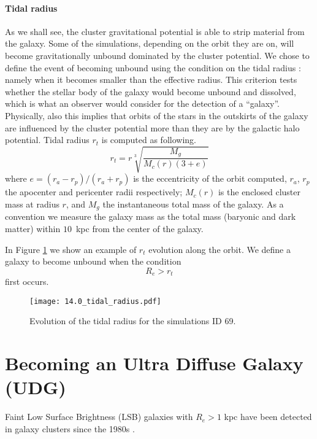 \paragraph*{Tidal radius}
As we shall see, the cluster gravitational potential is able to strip material from the galaxy. Some of the simulations, depending on the orbit they are on, will become gravitationally unbound dominated by the cluster potential.
We chose to define the event of becoming unbound using the condition on the tidal radius \cite{King1962}: namely when it becomes smaller than the effective radius.
This criterion tests whether the stellar body of the galaxy would become unbound and dissolved, which is what an observer would consider for the detection of a ``galaxy''.
Physically, also this implies that orbits of the stars in the outskirts of the galaxy are influenced by the cluster potential more than they are by the galactic halo potential.
Tidal radius $r_t$ is computed as following.
\begin{equation}
r_t = r \sqrt[3]{\frac{M_g}{M_c(r) (3+e)}}
\label{eq:tidal_radius}
\end{equation}
where $e = (r_a - r_p) / (r_a + r_p)$ is the eccentricity of the orbit computed, $r_a$, $r_p$ the apocenter and pericenter radii respectively; $M_c(r)$ is the enclosed cluster mass at radius $r$, and $M_g$ the instantaneous total mass of the galaxy.
As a convention we measure the galaxy mass as the total mass (baryonic and dark matter) within $10$~kpc from the center of the galaxy.

In Figure \ref{fig:tidal_radius} we show an example of $r_t$ evolution along the orbit.
We define a galaxy to become unbound when the condition
\begin{equation}
    R_e > r_t
\label{eq:tidal_radius_condition}
\end{equation}
first occurs.
\begin{figure}
\centering
\texttt{[image: 14.0\_tidal\_radius.pdf]}
\caption{Evolution of the tidal radius for the simulations ID 69.}
\label{fig:tidal_radius}
\end{figure}

\section{Becoming an Ultra Diffuse Galaxy (UDG)}
\label{sec:UDG}

Faint Low Surface Brightness (LSB) galaxies with $R_e > 1$ kpc have been detected in galaxy clusters since the 1980s \citep[e.g.][]{Sandage1984}.

